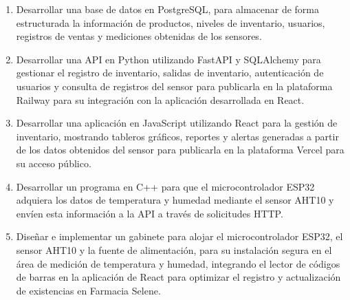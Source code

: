 
\begin{enumerate}
\item Desarrollar una base de datos en PostgreSQL, para almacenar de forma estructurada la información de productos, niveles de inventario, usuarios, registros de ventas y mediciones obtenidas de los sensores.

\item Desarrollar una API en Python utilizando FastAPI y SQLAlchemy para gestionar el registro de inventario, salidas de inventario, autenticación de usuarios y consulta de registros del sensor para publicarla en la plataforma Railway para su integración con la aplicación desarrollada en React.

\item Desarrollar una aplicación en JavaScript utilizando React para la gestión de inventario, mostrando tableros gráficos, reportes y alertas generadas a partir de los datos obtenidos del sensor para publicarla en la plataforma Vercel para su acceso público.

\item Desarrollar un programa en C++ para que el microcontrolador ESP32 adquiera los datos de temperatura y humedad mediante el sensor AHT10 y envíen esta información a la API a través de solicitudes HTTP.  

\item Diseñar e implementar un gabinete para alojar el microcontrolador ESP32, el sensor AHT10 y la fuente de alimentación, para su instalación segura en el área de medición de temperatura y humedad, integrando el lector de códigos de barras en la aplicación de React para optimizar el registro y actualización de existencias en Farmacia Selene.

\end{enumerate}

\thispagestyle{empty}